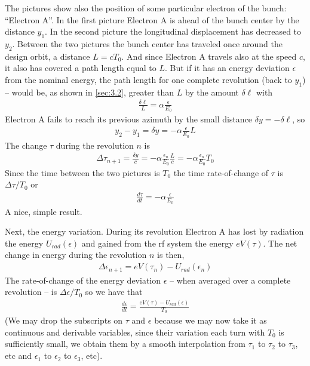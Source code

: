 The pictures show also the position of some particular electron of the bunch: “Electron A”. In the first picture Electron A is ahead of the bunch center by the distance $y_1$. In the second picture the longitudinal displacement has decreased to $y_2$. Between the two pictures the bunch center has traveled once around the design orbit, a distance $L=cT_0$. And since Electron A travels also at the speed $c$, it also has covered a path length equal to $L$. But if it has an energy deviation $\epsilon$ from the nominal energy, the path length for one complete revolution (back to $y_1$) -- would be, as shown in \autoref{sec:3.2}, greater than $L$ by the amount $\delta \ell$ with
\begin{align}
	\frac{\delta \ell}{L} = \alpha\frac{\epsilon}{E_0}
\end{align}
Electron A fails to reach its previous azimuth by the small distance $\delta y = -\delta \ell$, so
\begin{align}
	y_2 - y_1 = \delta y = -\alpha \frac{\epsilon}{E_0}L
\end{align}
The change $\tau$ during the revolution $n$ is
\begin{align}
	\Delta \tau_{n+1} = \frac{\delta y}{c} = -\alpha \frac{\epsilon_n}{E_0}\frac{L}{c} = -\alpha\frac{\epsilon_n}{E_0}T_0
\end{align}
Since the time between the two pictures is $T_0$ the time rate-of-change of $\tau$ is $\Delta \tau/T_0$ or
\begin{align}
	\frac{d \tau}{dt} = -\alpha \frac{\epsilon}{E_0}\label{eq:3.32}
\end{align}
A nice, simple result.

Next, the energy variation. During its revolution Electron A has lost by radiation the energy $U_{rad}(\epsilon)$ and gained from the rf system the energy $eV(\tau)$. The net change in energy during the revolution $n$ is then,
\begin{align}
	\Delta \epsilon_{n+1} = eV(\tau_n)-U_{rad}(\epsilon_n)
\end{align}
The rate-of-change of the energy deviation $\epsilon$ -- when averaged over a complete revolution -- is $\Delta \epsilon/T_0$ so we have that
\begin{align}
	\frac{d\epsilon}{dt} = \frac{eV(\tau)-U_{rad}(\epsilon)}{T_0}\label{eq:3.34}
\end{align}
(We may drop the subscripts on $\tau$ and $\epsilon$ because we may now take it as continuous and derivable variables, since their variation each turn with $T_0$ is sufficiently small, we obtain them by a smooth interpolation from $\tau_1$ to $\tau_2$ to $\tau_3$, etc and $\epsilon_1$ to $\epsilon_2$ to $\epsilon_3$, etc).


